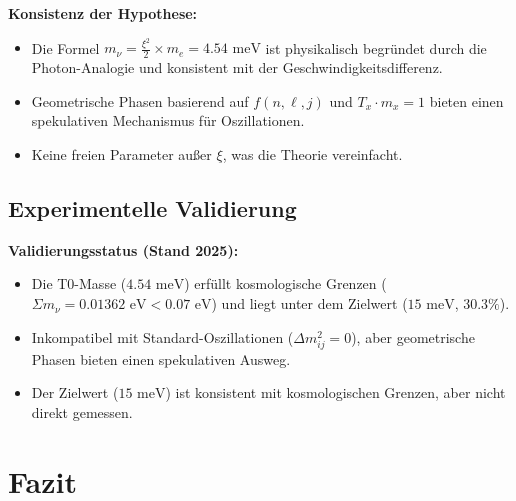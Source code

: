 \documentclass[12pt,a4paper]{article}
\newcommand{\xipar}{\xi}
\begin{document}
	\begin{important}
		\textbf{Konsistenz der Hypothese:}
		\begin{itemize}
			\item Die Formel \(m_\nu = \frac{\xipar^2}{2} \times m_e = 4.54 \text{ meV}\) ist physikalisch begründet durch die Photon-Analogie und konsistent mit der Geschwindigkeitsdifferenz.
			\item Geometrische Phasen basierend auf \(f(n, \ell, j)\) und \(T_x \cdot m_x = 1\) bieten einen spekulativen Mechanismus für Oszillationen.
			\item Keine freien Parameter außer \(\xipar\), was die Theorie vereinfacht.
		\end{itemize}
	\end{important}
	
	\subsection{Experimentelle Validierung}
	
	\begin{experimental}
		\textbf{Validierungsstatus (Stand 2025):}
		\begin{itemize}
			\item Die T0-Masse (\(4.54 \text{ meV}\)) erfüllt kosmologische Grenzen (\(\Sigma m_\nu = 0.01362 \text{ eV} < 0.07 \text{ eV}\)) und liegt unter dem Zielwert (\(15 \text{ meV}\), \(30.3\%\)).
			\item Inkompatibel mit Standard-Oszillationen (\(\Delta m^2_{ij} = 0\)), aber geometrische Phasen bieten einen spekulativen Ausweg.
			\item Der Zielwert (\(15 \text{ meV}\)) ist konsistent mit kosmologischen Grenzen, aber nicht direkt gemessen.
		\end{itemize}
	\end{experimental}
	
	\section{Fazit}
	
\end{document}

